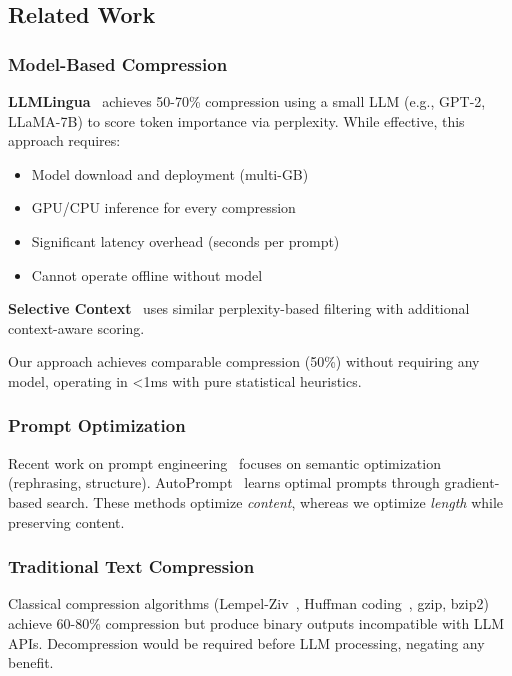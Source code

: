 \subsection{Related Work}

\subsubsection{Model-Based Compression}

\textbf{LLMLingua}~\cite{pan2023llmlingua} achieves 50-70\% compression using a small LLM (e.g., GPT-2, LLaMA-7B) to score token importance via perplexity. While effective, this approach requires:
\begin{itemize}
    \item Model download and deployment (multi-GB)
    \item GPU/CPU inference for every compression
    \item Significant latency overhead (seconds per prompt)
    \item Cannot operate offline without model
\end{itemize}

\textbf{Selective Context}~\cite{li2023selective} uses similar perplexity-based filtering with additional context-aware scoring.

Our approach achieves comparable compression (50\%) without requiring any model, operating in <1ms with pure statistical heuristics.

\subsubsection{Prompt Optimization}

Recent work on prompt engineering~\cite{white2023prompt,liu2023pre} focuses on semantic optimization (rephrasing, structure). AutoPrompt~\cite{shin2020autoprompt} learns optimal prompts through gradient-based search. These methods optimize \textit{content}, whereas we optimize \textit{length} while preserving content.

\subsubsection{Traditional Text Compression}

Classical compression algorithms (Lempel-Ziv~\cite{ziv1977universal}, Huffman coding~\cite{huffman1952method}, gzip, bzip2) achieve 60-80\% compression but produce binary outputs incompatible with LLM APIs. Decompression would be required before LLM processing, negating any benefit.

